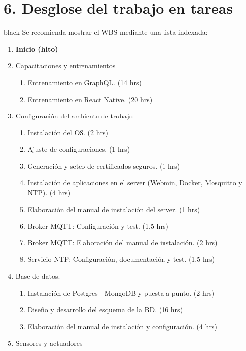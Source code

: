 \documentclass[11pt]{charter}
\begin{document}
\section{6. Desglose del trabajo en tareas}
\label{sec:wbs}

\begin{consigna}{black}
Se recomienda mostrar el WBS mediante una lista indexada:

\begin{enumerate}
\item \textbf{Inicio (hito)}
\item Capacitaciones y entrenamientos
	\begin{enumerate}
		\item Entrenamiento en GraphQL. (14 hrs)
		\item Entrenamiento en React Native. (20 hrs)
	\end{enumerate}
\item Configuración del ambiente de trabajo
	\begin{enumerate}
		\item Instalación del OS. (2 hrs)
		\item Ajuste de configuraciones. (1 hrs)
		\item Generación y seteo de certificados seguros. (1 hrs)
		\item Instalación de aplicaciones en el server (Webmin, Docker, Mosquitto y NTP). (4 hrs)
		\item Elaboración del manual de instalación del server. (1 hrs)
		\item Broker MQTT: Configuración y test. (1.5 hrs)
		\item Broker MQTT: Elaboración del manual de instalación. (2 hrs)
		\item Servicio NTP: Configuración, documentación y test. (1.5 hrs)
	\end{enumerate}
\item Base de datos.
	\begin{enumerate}
		\item Instalación de Postgres - MongoDB y puesta a punto. (2 hrs)
		\item Diseño y desarrollo del esquema de la BD. (16 hrs)
		\item Elaboración del manual de instalación y configuración. (4 hrs)
	\end{enumerate}
\item Sensores y actuadores
	\begin{enumerate}

\end{enumerate}
\end{enumerate}
\end{consigna}
\end{document}
